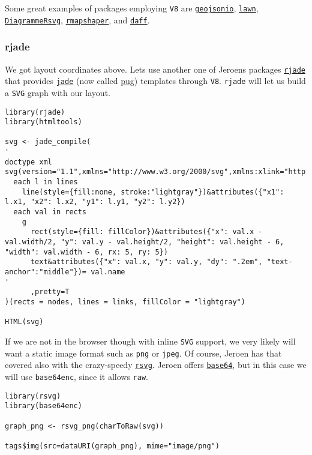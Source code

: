 Some great examples of packages employing \texttt{V8} are
\href{http://www.r-pkg.org/pkg/geojsonio}{\texttt{geojsonio}},
\href{https://github.com/ropensci/lawn}{\texttt{lawn}},
\href{http://www.r-pkg.org/pkg/DiagrammeRsvg}{\texttt{DiagrammeRsvg}},
\href{https://github.com/ateucher/rmapshaper}{\texttt{rmapshaper}}, and
\href{https://github.com/edwindj/daff}{\texttt{daff}}.

\subsubsection{rjade}

We got layout coordinates above. Let\textquotesingle{}s use another one of Jeroen\textquotesingle{}s
packages \href{https://github.com/jeroenooms/rjade}{\texttt{rjade}} that provides
\href{http://jade-lang.com/}{\texttt{jade}} (now called
\href{https://github.com/pugjs/pug}{pug}) templates through \texttt{V8}. \texttt{rjade}
will let us build a \texttt{SVG} graph with our layout.

\begin{verbatim}
library(rjade)
library(htmltools)

svg <- jade_compile(
'
doctype xml
svg(version="1.1",xmlns="http://www.w3.org/2000/svg",xmlns:xlink="http://www.w3.org/1999/xlink",width="960px",height="500px")
  each l in lines
    line(style={fill:none, stroke:"lightgray"})&attributes({"x1": l.x1, "x2": l.x2, "y1": l.y1, "y2": l.y2})
  each val in rects
    g
      rect(style={fill: fillColor})&attributes({"x": val.x - val.width/2, "y": val.y - val.height/2, "height": val.height - 6, "width": val.width - 6, rx: 5, ry: 5})
      text&attributes({"x": val.x, "y": val.y, "dy": ".2em", "text-anchor":"middle"})= val.name
'
      ,pretty=T
)(rects = nodes, lines = links, fillColor = "lightgray")

HTML(svg)
\end{verbatim}

If we are not in the browser though with inline \texttt{SVG} support, we very
likely will want a static image format such as \texttt{png} or \texttt{jpeg}. Of
course, Jeroen has that covered also with the crazy-speedy
\href{https://github.com/jeroenooms/rsvg}{\texttt{rsvg}}. Jeroen offers
\href{https://github.com/jeroenooms/base64}{\texttt{base64}}, but in this case we
will use \texttt{base64enc}, since it allows \texttt{raw}.

\begin{verbatim}
library(rsvg)
library(base64enc)

graph_png <- rsvg_png(charToRaw(svg))

tags$img(src=dataURI(graph_png), mime="image/png")
\end{verbatim}


